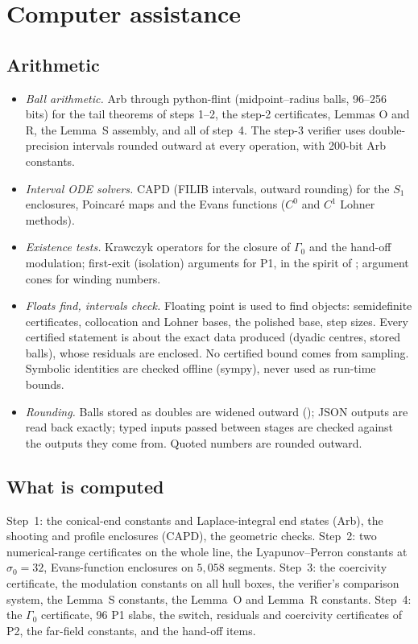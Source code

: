 \documentclass[11pt]{amsart}
\theoremstyle{definition}
\theoremstyle{remark}
\newcommand{\fn}[1]{\texttt{\detokenize{#1}}}
\begin{document}
\section{Computer assistance}\label{s:cap}

\subsection{Arithmetic}
\begin{itemize}[leftmargin=*,itemsep=1pt]
\item \emph{Ball arithmetic.} Arb \cite{Johansson2017} through python-flint (midpoint--radius balls, 96--256 bits) for the tail theorems of steps 1--2, the step-2 certificates, Lemmas O and R, the Lemma~S assembly, and all of step~4. The step-3 verifier uses double-precision intervals rounded outward at every operation, with 200-bit Arb constants.
\item \emph{Interval ODE solvers.} CAPD \cite{CAPD2021} (FILIB intervals, outward rounding) for the $S_1$ enclosures, Poincar\'e maps and the Evans functions ($C^0$ and $C^1$ Lohner methods).
\item \emph{Existence tests.} Krawczyk operators \cite{Krawczyk1969} for the closure of $\Gamma_0$ and the hand-off modulation; first-exit (isolation) arguments for P1, in the spirit of \cite{Zgliczynski2004}; argument cones for winding numbers.
\item \emph{Floats find, intervals check.} Floating point is used to find objects: semidefinite certificates, collocation and Lohner bases, the polished base, step sizes. Every certified statement is about the exact data produced (dyadic centres, stored balls), whose residuals are enclosed. No certified bound comes from sampling. Symbolic identities are checked offline (sympy), never used as run-time bounds.
\item \emph{Rounding.} Balls stored as doubles are widened outward (\fn{nextafter}); JSON outputs are read back exactly; typed inputs passed between stages are checked against the outputs they come from. Quoted numbers are rounded outward.
\end{itemize}

\subsection{What is computed}
Step~1: the conical-end constants and Laplace-integral end states (Arb), the shooting and profile enclosures (CAPD), the geometric checks. Step~2: two numerical-range certificates on the whole line, the Lyapunov--Perron constants at $\sigma_0=32$, Evans-function enclosures on $5{,}058$ segments. Step~3: the coercivity certificate, the modulation constants on all hull boxes, the verifier's comparison system, the Lemma~S constants, the Lemma~O and Lemma~R constants. Step~4: the $\Gamma_0$ certificate, 96 P1 slabs, the switch, residuals and coercivity certificates of P2, the far-field constants, and the hand-off items.
\end{document}
